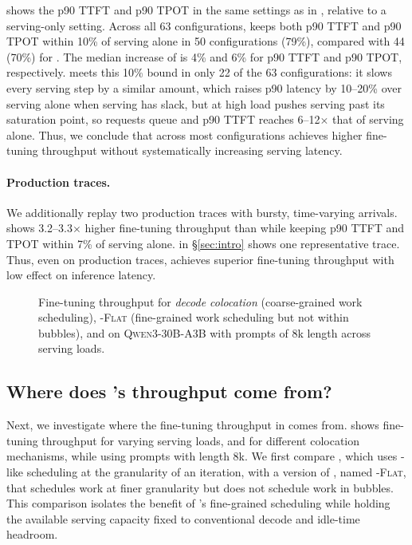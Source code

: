  shows the p90 \ac{TTFT} and p90 \ac{TPOT} in the same settings as in , relative to a serving-only setting.
Across all 63 configurations, \sys keeps both p90 \ac{TTFT} and p90 \ac{TPOT} within 10\% of serving alone in 50 configurations (79\%), compared with 44 (70\%) for \llmstation.
The median increase of \sys is 4\% and 6\% for p90 \ac{TTFT} and p90 \ac{TPOT}, respectively.
\emph{\Uncoord} meets this 10\% bound in only 22 of the 63 configurations: it slows every serving step by a similar amount, which raises p90 latency by 10--20\% over serving alone when serving has slack, but at high load pushes serving past its saturation point, so requests queue and p90 \ac{TTFT} reaches 6--12$\times$ that of serving alone.
Thus, we conclude that \sys across most configurations achieves higher fine-tuning throughput without systematically increasing serving latency.

\paragraph{Production traces.}
We additionally replay two production traces with bursty, time-varying arrivals.
\sys shows 3.2--3.3$\times$ higher fine-tuning throughput than \llmstation while keeping p90 \ac{TTFT} and \ac{TPOT} within 7\% of serving alone.
 in \S\ref{sec:intro} shows one representative trace.
Thus, even on production traces, \sys achieves superior fine-tuning throughput with low effect on inference latency.

\begin{figure}[t]
  \centering
  \caption{Fine-tuning throughput for \emph{decode colocation} (coarse-grained work scheduling), \sys-\textsc{Flat} (fine-grained work scheduling but not within bubbles), and \sys on \textsc{Qwen3-30B-A3B} with prompts of 8k length across serving loads.}
  \label{fig:eval-sources}
\end{figure}

\subsection{Where does \sys's throughput come from?}
\label{sec:eval-ablation}

Next, we investigate where the fine-tuning throughput in \sys comes from.
 shows fine-tuning throughput for varying serving loads, and for different colocation mechanisms, while using prompts with length 8k.
We first compare \emph{\cfgColo}, which uses \llmstation-like scheduling at the granularity of an iteration, with a version of \sys, named \sys-\textsc{Flat}, that schedules work at finer granularity but does not schedule work in bubbles.
This comparison  isolates the benefit of \sys's fine-grained scheduling while holding the available serving capacity fixed to conventional decode and idle-time headroom.

